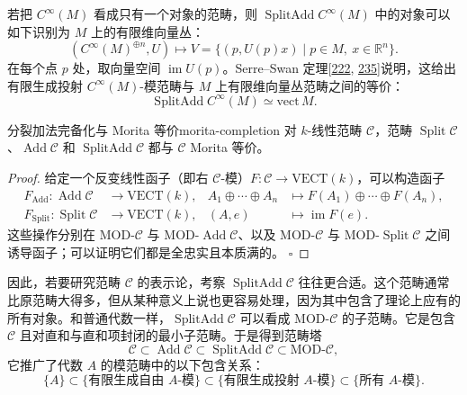 \begin{example}[向量丛与投射模]\label{ex:vector-bundles}
若把 $C^\infty(M)$ 看成只有一个对象的范畴，则 $\operatorname{SplitAdd}C^\infty(M)$ 中的对象可以如下识别为 $M$ 上的有限维向量丛：
\[
  (C^\infty(M)^{\oplus n},U)\longmapsto
  V=\{(p,U(p)x)\mid p\in M,\ x\in\mathbb R^n\}.
\]
在每个点 $p$ 处，取向量空间 $\operatorname{im}U(p)$。Serre--Swan 定理[\hyperlink{ref:222}{222}, \hyperlink{ref:235}{235}]说明，这给出有限生成投射 $C^\infty(M)$-模范畴与 $M$ 上有限维向量丛范畴之间的等价：
\[
  \operatorname{SplitAdd}C^\infty(M)\simeq\mathrm{vect}\,M.
\]
\end{example}

\begin{theorem}{分裂加法完备化与 Morita 等价}{morita-completion}
对 $k$-线性范畴 $\mathcal C$，范畴 $\operatorname{Split}\mathcal C$、$\operatorname{Add}\mathcal C$ 和 $\operatorname{SplitAdd}\mathcal C$ 都与 $\mathcal C$ Morita 等价。
\end{theorem}

\begin{proof}
给定一个反变线性函子（即右 $\mathcal C$-模）$F\colon\mathcal C\to\mathrm{VECT}(k)$，可以构造函子
\[
\begin{aligned}
F_{\mathrm{Add}}\colon\operatorname{Add}\mathcal C&\to\mathrm{VECT}(k),&
A_1\oplus\cdots\oplus A_n&\longmapsto
F(A_1)\oplus\cdots\oplus F(A_n),\\
F_{\mathrm{Split}}\colon\operatorname{Split}\mathcal C&\to\mathrm{VECT}(k),&
(A,e)&\longmapsto\operatorname{im}F(e).
\end{aligned}
\]
这些操作分别在 $\mathrm{MOD}\text{-}\mathcal C$ 与 $\mathrm{MOD}\text{-}\operatorname{Add}\mathcal C$、以及 $\mathrm{MOD}\text{-}\mathcal C$ 与 $\mathrm{MOD}\text{-}\operatorname{Split}\mathcal C$ 之间诱导函子；可以证明它们都是全忠实且本质满的。
\hfill$\square$
\end{proof}

因此，若要研究范畴 $\mathcal C$ 的表示论，考察 $\operatorname{SplitAdd}\mathcal C$ 往往更合适。这个范畴通常比原范畴大得多，但从某种意义上说也更容易处理，因为其中包含了理论上应有的所有对象。和普通代数一样，$\operatorname{SplitAdd}\mathcal C$ 可以看成 $\mathrm{MOD}\text{-}\mathcal C$ 的子范畴。它是包含 $\mathcal C$ 且对直和与直和项封闭的最小子范畴。于是得到范畴塔
\[
  \mathcal C\subset\operatorname{Add}\mathcal C
  \subset\operatorname{SplitAdd}\mathcal C
  \subset\mathrm{MOD}\text{-}\mathcal C,
\]
它推广了代数 $A$ 的模范畴中的以下包含关系：
\[
  \{A\}\subset
  \{\text{有限生成自由 }A\text{-模}\}\subset
  \{\text{有限生成投射 }A\text{-模}\}\subset
  \{\text{所有 }A\text{-模}\}.
\]

